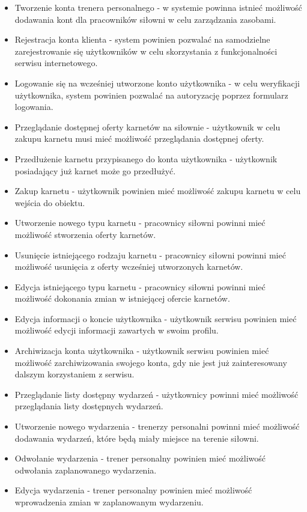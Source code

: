 \documentclass[a4paper,twoside,12pt]{book}
\begin{document}
		\begin{itemize}
			\item Tworzenie konta trenera personalnego - w systemie powinna istnieć możliwość dodawania kont dla pracowników siłowni w celu zarządzania zasobami.
			\item Rejestracja konta klienta - system powinien pozwalać na samodzielne zarejestrowanie się użytkowników w celu skorzystania z funkcjonalności serwisu internetowego.
			\item Logowanie się na wcześniej utworzone konto użytkownika - w celu weryfikacji użytkownika, system powinien pozwalać na autoryzację poprzez formularz logowania.
			\item Przeglądanie dostępnej oferty karnetów na siłownie - użytkownik w celu zakupu karnetu musi mieć możliwość przeglądania dostępnej oferty.
			\item Przedłużenie karnetu przypisanego do konta użytkownika - użytkownik posiadający już karnet może go przedłużyć.
			\item Zakup karnetu - użytkownik powinien mieć możliwość zakupu karnetu w celu wejścia do obiektu.
			\item Utworzenie nowego typu karnetu - pracownicy siłowni powinni mieć możliwość stworzenia oferty karnetów.
			\item Usunięcie istniejącego rodzaju karnetu - pracownicy siłowni powinni mieć możliwość usunięcia z oferty wcześniej utworzonych karnetów.
			\item Edycja istniejącego typu karnetu - pracownicy siłowni powinni mieć możliwość dokonania zmian w istniejącej ofercie karnetów.
			\item Edycja informacji o koncie użytkownika - użytkownik serwisu powinien mieć możliwość edycji informacji zawartych w swoim profilu.
			\item Archiwizacja konta użytkownika - użytkownik serwisu powinien mieć możliwość zarchiwizowania swojego konta, gdy nie jest już zainteresowany dalszym korzystaniem z serwisu.
			\item Przeglądanie listy dostępny wydarzeń - użytkownicy powinni mieć możliwość przeglądania listy dostępnych wydarzeń.
			\item Utworzenie nowego wydarzenia - trenerzy personalni powinni mieć możliwość dodawania wydarzeń, które będą miały miejsce na terenie siłowni.
			\item Odwołanie wydarzenia - trener personalny powinien mieć możliwość odwołania zaplanowanego wydarzenia.
			\item Edycja wydarzenia - trener personalny powinien mieć możliwość wprowadzenia zmian w zaplanowanym wydarzeniu.

\end{itemize}
\end{document}
